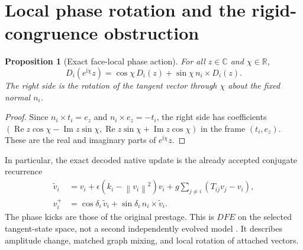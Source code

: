 \documentclass[11pt,a4paper]{article}
\numberwithin{equation}{section}
\newtheorem{proposition}{Proposition}[section]
\theoremstyle{definition}
\theoremstyle{remark}
\newcommand{\R}{\mathbb R}
\newcommand{\C}{\mathbb C}
\newcommand{\iu}{\mathrm i}
\newcommand{\eps}{\epsilon}
\newcommand{\re}{\operatorname{Re}}
\newcommand{\im}{\operatorname{Im}}
\newcommand{\norm}[1]{\left\lVert#1\right\rVert}
\begin{document}
\section{Local phase rotation and the rigid-congruence obstruction}
\label{sec:phase}

\begin{proposition}[Exact face-local phase action]\label{prop:phase}
For all $z\in\C$ and $\chi\in\R$,
\begin{equation}\label{eq:localphase}
\boxed{D_i(e^{\iu\chi}z)=
\cos\chi\,D_i(z)+\sin\chi\,n_i\times D_i(z).}
\end{equation}
The right side is the rotation of the tangent vector through $\chi$ about
the fixed normal $n_i$.
\end{proposition}
\begin{proof}
Since $n_i\times t_i=e_z$ and $n_i\times e_z=-t_i$, the right side has
coefficients $(\re z\cos\chi-\im z\sin\chi,
\re z\sin\chi+\im z\cos\chi)$ in the frame $(t_i,e_z)$. These are the
real and imaginary parts of $e^{\iu\chi}z$.
\end{proof}

In particular, the exact decoded native update is the already accepted
conjugate recurrence
\begin{align}
\widetilde v_i&=v_i+\eps(k_i-\norm{v_i}^2)v_i
       +g\sum_{j\ne i}(T_{ij}v_j-v_i),\label{eq:facepre}\\
v_i^+&=\cos\delta_i\,\widetilde v_i
       +\sin\delta_i\,n_i\times\widetilde v_i.\label{eq:facepost}
\end{align}
The phase kicks are those of the original prestage. This is $DFE$ on the
selected tangent-state space, not a second independently evolved model
\cite{Attachment}. It describes amplitude change, matched graph mixing,
and local rotation of attached vectors.
\end{document}
